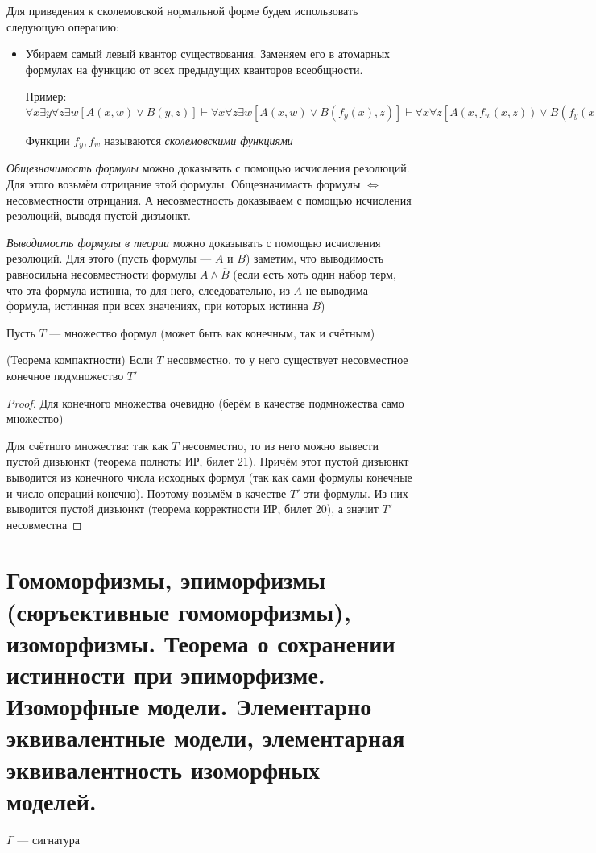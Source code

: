 \documentclass{article}
\begin{document}
Для приведения к сколемовской нормальной форме будем использовать следующую операцию:
\begin{itemize}
	\item Убираем самый левый квантор существования. Заменяем его в атомарных формулах на функцию от всех предыдущих кванторов всеобщности.

	Пример: $\forall x \exists y \forall z \exists w[A(x, w) \vee B(y, z)] \vdash \forall x \forall z \exists w[A(x, w) \vee B(f_y(x), z)] \vdash \forall x \forall z[A(x, f_w(x, z)) \vee B(f_y(x), z)]$

	Функции $f_y, f_w$ называются \textit{сколемовскими функциями}
\end{itemize}

\textit{Общезначимость формулы} можно доказывать с помощью исчисления резолюций. Для этого возьмём отрицание этой формулы. Общезначимасть формулы $\Leftrightarrow$ несовместности отрицания. А несовместность доказываем с помощью исчисления резолюций, выводя пустой дизъюнкт.

\textit{Выводимость формулы в теории} можно доказывать с помощью исчисления резолюций. Для этого (пусть формулы --- $A$ и $B$) заметим, что выводимость равносильна несовместности формулы $A \wedge \overline{B}$ (если есть хоть один набор терм, что эта формула истинна, то для него, слеедовательно, из $A$ не выводима формула, истинная при всех значениях, при которых истинна $B$)

Пусть $T$ --- множество формул (может быть как конечным, так и счётным)
\begin{theorem}{(Теорема компактности)}
	Если $T$ несовместно, то у него существует несовместное конечное подмножество $T'$
\end{theorem}

\begin{proof}
    Для конечного множества очевидно (берём в качестве подмножества само множество)

	Для счётного множества: так как $T$ несовместно, то из него можно вывести пустой дизъюнкт (теорема полноты ИР, билет 21). Причём этот пустой дизъюнкт выводится из конечного числа исходных формул (так как сами формулы конечные и число операций конечно). Поэтому возьмём в качестве $T'$ эти формулы. Из них выводится пустой дизъюнкт (теорема корректности ИР, билет 20), а значит $T'$ несовместна
\end{proof}

\section{Гомоморфизмы, эпиморфизмы (сюръективные гомоморфизмы), изоморфизмы. Теорема о сохранении истинности при эпиморфизме. Изоморфные модели. Элементарно эквивалентные модели, элементарная эквивалентность изоморфных моделей.}
$\Gamma$ --- сигнатура
\end{document}
